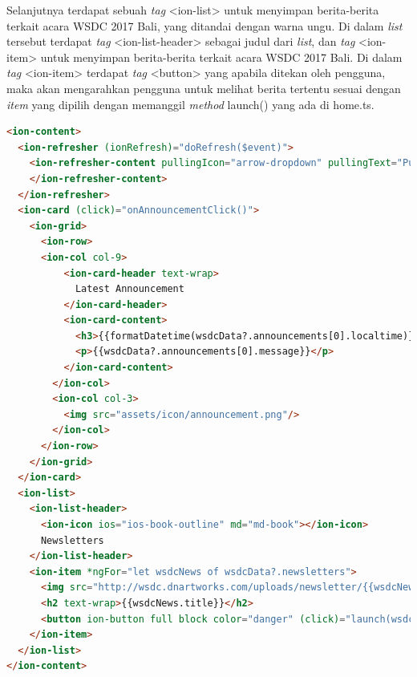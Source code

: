\begin{itemize}
\begin{itemize}
		Selanjutnya terdapat sebuah \textit{tag} <ion-list> untuk menyimpan berita-berita terkait acara WSDC 2017 Bali, yang ditandai dengan warna ungu. Di dalam \textit{list} tersebut terdapat \textit{tag} <ion-list-header> sebagai judul dari \textit{list}, dan \textit{tag} <ion-item> untuk menyimpan berita-berita terkait acara WSDC 2017 Bali. Di dalam \textit{tag} <ion-item> terdapat \textit{tag} <button> yang apabila ditekan oleh pengguna, maka akan mengarahkan pengguna untuk melihat berita tertentu sesuai dengan \textit{item} yang dipilih dengan memanggil \textit{method} launch() yang ada di home.ts. 

\newpage		
		
\begin{lstlisting}[language=html, label={lst:contentHome}, caption=\textit{Content} pada home.html]
<ion-content>
  <ion-refresher (ionRefresh)="doRefresh($event)">
    <ion-refresher-content pullingIcon="arrow-dropdown" pullingText="Pull to refresh" refreshingSpinner="circles" refreshingText="Refreshing...">
    </ion-refresher-content>
  </ion-refresher>
  <ion-card (click)="onAnnouncementClick()">
    <ion-grid>
      <ion-row>
      <ion-col col-9>
          <ion-card-header text-wrap>
            Latest Announcement
          </ion-card-header>
          <ion-card-content>
            <h3>{{formatDatetime(wsdcData?.announcements[0].localtime)}}</h3>
            <p>{{wsdcData?.announcements[0].message}}</p>
          </ion-card-content>
        </ion-col>
        <ion-col col-3>
          <img src="assets/icon/announcement.png"/>
        </ion-col>
      </ion-row>
    </ion-grid>
  </ion-card>
  <ion-list>
    <ion-list-header>
      <ion-icon ios="ios-book-outline" md="md-book"></ion-icon>
      Newsletters
    </ion-list-header>
    <ion-item *ngFor="let wsdcNews of wsdcData?.newsletters">
      <img src="http://wsdc.dnartworks.com/uploads/newsletter/{{wsdcNews.id}}/thumbnail.jpg" alt="{{wsdcNews.title}}">
      <h2 text-wrap>{{wsdcNews.title}}</h2>
      <button ion-button full block color="danger" (click)="launch(wsdcNews.url)">Read More</button>
    </ion-item>
  </ion-list>
</ion-content>
\end{lstlisting}
		
		
	\end{itemize}


\end{itemize}
